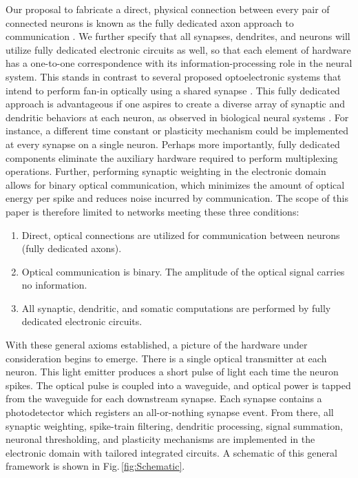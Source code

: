 \documentclass[twocolumn]{article}
\begin{document}
Our proposal to fabricate a direct, physical connection between every pair of connected neurons is known as the fully dedicated axon approach to communication \cite{seda2016}. We further specify that all synapses, dendrites, and neurons will utilize fully dedicated electronic circuits as well, so that each element of hardware has a one-to-one correspondence with its information-processing role in the neural system. This stands in contrast to several proposed optoelectronic systems that intend to perform fan-in optically using a shared synapse \cite{nazirzadeh2018energy, shastri2021photonics}. This fully dedicated approach is advantageous if one aspires to create a diverse array of synaptic and dendritic behaviors at each neuron, as observed in biological neural systems \cite{marder1987neurotransmitters, euler2001dendritic}. For instance, a different time constant or plasticity mechanism could be implemented at every synapse on a single neuron. Perhaps more importantly, fully dedicated components eliminate the auxiliary hardware required to perform multiplexing operations. Further, performing synaptic weighting in the electronic domain allows for binary optical communication, which minimizes the amount of optical energy per spike and reduces noise incurred by communication. The scope of this paper is therefore limited to networks meeting these three conditions:

\begin{enumerate}
    \item Direct, optical connections are utilized for communication between neurons (fully dedicated axons).
    \item Optical communication is binary. The amplitude of the optical signal carries no information.
    \item All synaptic, dendritic, and somatic computations are performed by fully dedicated electronic circuits.
\end{enumerate}

With these general axioms established, a picture of the hardware under consideration begins to emerge. There is a single optical transmitter at each neuron. This light emitter produces a short pulse of light each time the neuron spikes. The optical pulse is coupled into a waveguide, and optical power is tapped from the waveguide for each downstream synapse. Each synapse contains a photodetector which registers an all-or-nothing synapse event. From there, all synaptic weighting, spike-train filtering, dendritic processing, signal summation, neuronal thresholding, and plasticity mechanisms are implemented in the electronic domain with tailored integrated circuits. A schematic of this general framework is shown in Fig.\,\ref{fig:Schematic}.
\end{document}
